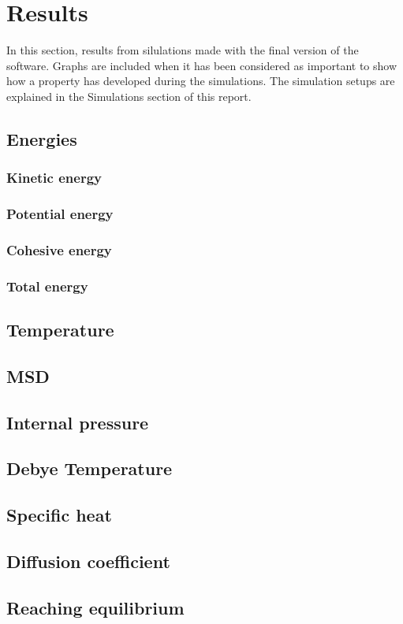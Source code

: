 \section{Results}
In this section, results from silulations made with the final version of the software. Graphs are included when it has been considered as important to show how a property has developed during the simulations. The simulation setups are explained in the Simulations section of this report.
\subsection{Energies}
\subsubsection{Kinetic energy}
\subsubsection{Potential energy}
\subsubsection{Cohesive energy}
\subsubsection{Total energy}
\subsection{Temperature}
\subsection{MSD}
\subsection{Internal pressure}
\subsection{Debye Temperature}
\subsection{Specific heat}
\subsection{Diffusion coefficient}
\subsection{Reaching equilibrium}
